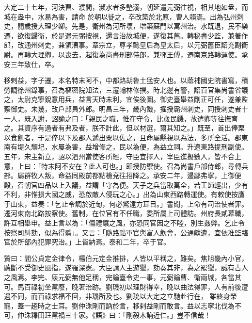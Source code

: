 \begin{pinyinscope}
 大定二十七年，河決曹、濮間，瀕水者多墊溺，朝延遣元弼往視，相其地如盎，而城在盎中，水易為害，請命
 於朝以徙之，卒改築於北原，曹人賴焉。出為弘州刺史，閱歲授大理少卿。先是，衛州為河所壞，增築蘇門以寓州治。水既退，民不樂遷，欲復歸衛，於是遣元弼按視，還言治故城便，遂復其舊。轉秘書少監，兼著作郎，改通州刺史，兼領漕事。章宗立，尊孝懿皇后為皇太后，以元弼舊臣詔充副衛尉。再轉大理卿，以喪去，起復為尚書刑部侍郎，兼鄆王傅，遷南京路轉運使。承安三年致仕，卒。



 移剌益，字子遷，本名特末阿不，中都路胡魯土猛安人也。以蔭補國史院書寫，積勞調徐州錄事，召為樞密院知法，三遷翰林修撰。時北邊有警，詔百官集尚書省議
 之，太尉克寧銳意用兵，益言天時未利，宜俟後圖。御史臺舉益剛正可任，遂兼監察御史。未幾，改戶部員外郎。明昌三年，畿內饑，擢授霸州刺史，同授刺史者十一人，既入謝，詔諭之曰：「親民之職，惟在守令，比歲民饑，故遣卿等往撫育之。其資序有過者有弗及者，朕不計此，但以材選，爾其知之。」既至，首出俸粟以食飢者，于是倅以下及郡人遞出粟以佐之，且命屬縣視以為法，多所全活。郡東南有堤久頹圮，水屢為害，益增修之，民以為便，為益立祠。升遼東路提刑副使。五年，宋主新立，詔以泗州當使客所經，守臣宜擇人，宰臣進擬數人，皆不合上
 意，上曰：「特末阿不安在？此人可也。」即授防禦使。召為尚書戶部侍郎，尋轉兵部。屬群牧人叛，命益同殿前都點檢兗往招降之。承安二年，邊鄙弗寧，上御便殿，召朝官四品以上入議，益謂「守為便。天子之兵當取萬全，若王師輕出，少有不利，非惟損大國之威，恐啟敵人侵玩之心。」出為山東西路轉運使。有敕使按鷹于山東，益奏：「乞止令調於近甸，何必驚遠方耳目。」書聞，上命有司治使者罪。遷河東南北路按察使。舊制，在位官有不任職，委所屬上司體訪。州府長貳幕職，許互相舉申。益上言以為：「傷禮讓之風，亦恐同官因之不睦，別生姦弊。乞止令
 按察司糾劾，似為得體」。又言：「隨路點軍官與富人飲會，公通獻遺，宜依准監臨官於所部內犯罪究治。」上皆納焉。泰和二年，卒于官。



 贊曰：閻公貞定金律令，楊伯元定金推排，人皆以平稱之，難矣。焦旭畿內小官，聽斷不受御史風指，遂罹深憲。大臣請人主遊獵，劾奏其非，為之罷獵，誠有古人之風焉。李完、康元弼無他足稱，完論臺令史一事，元弼論曹、衛兩城，各當其可。馬百祿初坐黨廢，晚著治跡。劉璣初以理財得幸，晚以曲法得罪，人有前後遭遇不同，而百祿求福不回，非璣所及也。劉珫以大定之立馳赴行在，
 雖終身榮寵，蓋一趨時之士耳。劉仲洙剛而訥於言，移剌益剛而敢言。益以志寧北伐為不可，仲洙釋田玨黨禍三十家。《語》曰：「剛毅木訥近仁。」豈不信哉！



\end{pinyinscope}